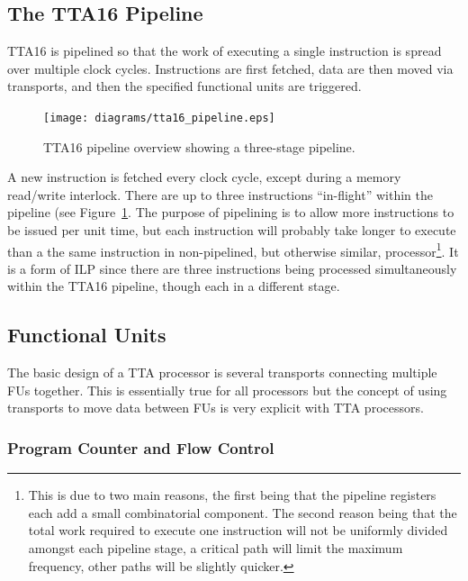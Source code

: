 \subsection{The TTA16 Pipeline}
TTA16 is pipelined so that the work of executing a single instruction is spread
over multiple clock cycles. Instructions are first fetched, data are then moved
via transports, and then the specified functional units are triggered.

\begin{figure}[h!]
\begin{center}
\texttt{[image: diagrams/tta16\_pipeline.eps]}
\caption[TTA16 pipeline overview]{TTA16 pipeline overview showing a three-stage
pipeline.}
\end{center}
\label{TTA16_Pipeline}
\end{figure}

A new instruction is fetched every clock cycle, except during a memory read/write
interlock. There are up to three instructions ``in-flight'' within the pipeline
(see Figure~\ref{TTA16_Pipeline}. The purpose of pipelining is to allow more
instructions to be issued per unit time, but each instruction will probably take
longer to execute than a the same instruction in non-pipelined, but otherwise
similar, processor\footnote{This is due to two main reasons, the first being that
the pipeline registers each add a small combinatorial component. The second
reason being that the total work required to execute one instruction will not be
uniformly divided amongst each pipeline stage, a critical path will limit the
maximum frequency, other paths will be slightly quicker.}. It is a form of ILP
since there are three instructions being processed simultaneously within the
TTA16 pipeline, though each in a different stage.


\subsection{Functional Units}
\label{TTA16_FUs}
The basic design of a TTA processor is several transports connecting multiple
FUs together. This is essentially true for all processors but the concept of
using transports to move data between FUs is very explicit with TTA processors.


\subsubsection{Program Counter and Flow Control}


